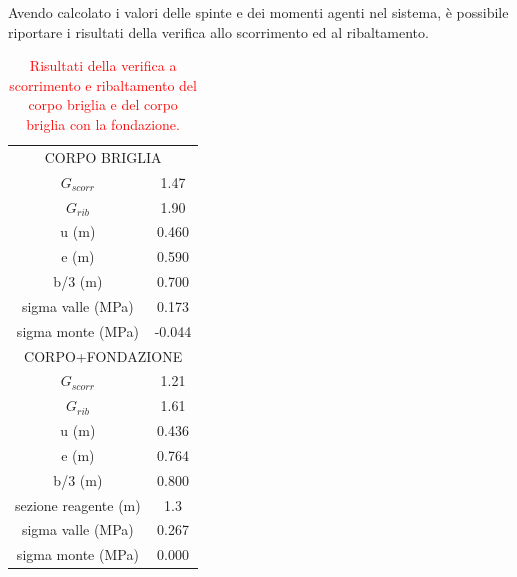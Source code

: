 Avendo calcolato i valori delle spinte e dei momenti agenti nel sistema, è possibile riportare i risultati della verifica allo scorrimento ed al ribaltamento.
\begin{table}[H] \centering
    \caption{\textcolor{red}{Risultati della verifica a scorrimento e ribaltamento del corpo briglia e del corpo briglia con la fondazione.}}
    \begin{tabular}{cc}
    \toprule
    \multicolumn{2}{c}{CORPO BRIGLIA} \\
    $G_{scorr}$                               & 1.47                 \\
    $G_{rib}$                              & 1.90                 \\
    u (m)                             & 0.460                \\
    e (m)                             & 0.590                \\
    b/3 (m)                           & 0.700                \\
    sigma valle (MPa)                 & 0.173                \\
    sigma monte (MPa)                 & -0.044               \\
    \midrule
    \multicolumn{2}{c}{CORPO+FONDAZIONE}                     \\
    $G_{scorr}$                       & 1.21                 \\
    $G_{rib}$                         & 1.61                 \\
    u (m)                             & 0.436                \\
    e (m)                             & 0.764                \\
    b/3 (m)                           & 0.800                \\
    sezione reagente (m)              & 1.3                  \\
    sigma valle (MPa)                 & 0.267                \\
    sigma monte (MPa)                 & 0.000                \\
    \bottomrule
    \end{tabular}
    \end{table}

